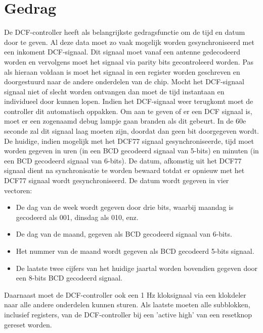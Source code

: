 \section{Gedrag}
De DCF-controller heeft als belangrijkste gedragsfunctie om de tijd en datum door te geven. Al deze data moet zo vaak mogelijk worden gesynchroniseerd met een inkoment DCF-signaal. Dit signaal moet vanaf een antenne gedecodeerd worden en vervolgens moet het signaal via parity bits gecontroleerd worden. Pas als hieraan voldaan is moet het signaal in een register worden geschreven en doorgestuurd naar de andere onderdelen van de chip. Mocht het DCF-signaal signaal niet of slecht worden ontvangen dan moet de tijd instantaan en individueel door kunnen lopen. Indien het DCF-signaal weer terugkomt moet de controller dit automatisch oppakken. Om aan te geven of er een  DCF signaal is, moet er een zogenaamd debug lampje gaan branden als dit gebeurt. In de 60e seconde zal dit signaal laag moeten zijn, doordat dan geen bit doorgegeven wordt. \\
De huidige, indien mogelijk met het DCF77 signaal gesynchroniseerde, tijd moet worden gegeven in uren (in een BCD gecodeerd signaal van 5-bits) en minuten (in een BCD gecodeerd signaal van 6-bits). De datum, afkomstig uit het DCF77 signaal dient na synchronisatie te worden bewaard totdat er opnieuw met het DCF77 signaal wordt gesynchroniseerd. De datum wordt gegeven in vier vectoren:
\begin{itemize}[nolistsep]
\item De dag van de week wordt gegeven door drie bits, waarbij maandag is gecodeerd als 001, dinsdag als 010, enz.
\item De dag van de maand, gegeven als BCD gecodeerd signaal van 6-bits.
\item Het nummer van de maand wordt gegeven als BCD gecodeerd 5-bits signaal.
\item De laatste twee cijfers van het huidige jaartal worden bovendien gegeven door een 8-bits BCD gecodeerd signaal.
\end{itemize}
\vspace{0.3cm}
Daarnaast moet de DCF-controller ook een 1 Hz kloksignaal via een klokdeler naar alle andere onderdelen kunnen sturen.
Als laatste moeten alle subblokken, inclusief registers, van de DCF-controller bij een 'active high' van een resetknop gereset worden.